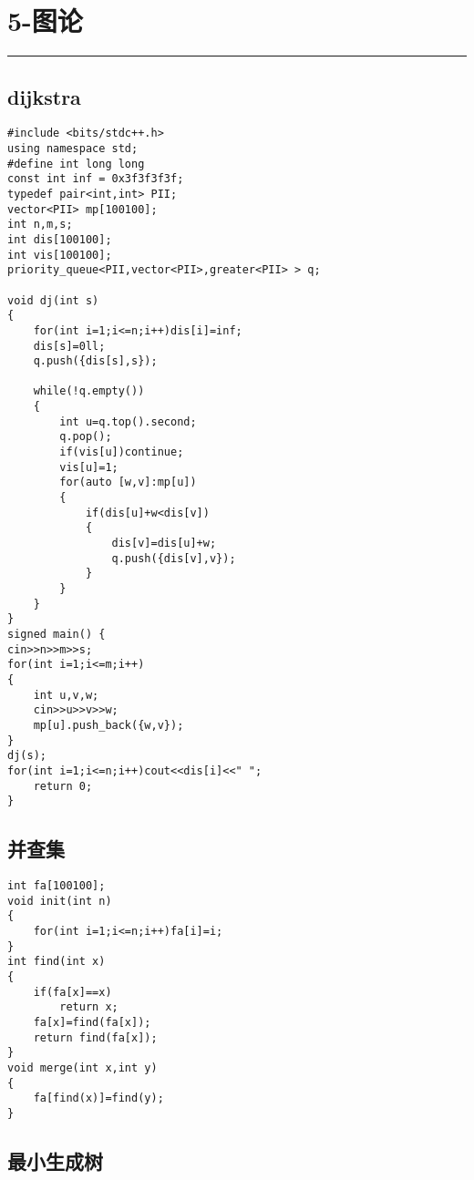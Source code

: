 \documentclass[]{article}
\begin{document}
\hypertarget{ux56feux8bba}{%
\section{5-图论}\label{ux56feux8bba}}

\begin{center}\rule{0.5\linewidth}{0.5pt}\end{center}

\hypertarget{dijkstra}{%
\subsection{dijkstra}\label{dijkstra}}

\begin{verbatim}
#include <bits/stdc++.h>
using namespace std;
#define int long long
const int inf = 0x3f3f3f3f;
typedef pair<int,int> PII;
vector<PII> mp[100100];
int n,m,s;
int dis[100100];
int vis[100100];
priority_queue<PII,vector<PII>,greater<PII> > q;

void dj(int s)
{
    for(int i=1;i<=n;i++)dis[i]=inf;
    dis[s]=0ll;
    q.push({dis[s],s});
    
    while(!q.empty())
    {
        int u=q.top().second;
        q.pop();
        if(vis[u])continue;
        vis[u]=1;
        for(auto [w,v]:mp[u])
        {
            if(dis[u]+w<dis[v])
            {
                dis[v]=dis[u]+w;
                q.push({dis[v],v});
            }
        }
    }
}
signed main() {
cin>>n>>m>>s;
for(int i=1;i<=m;i++)
{
    int u,v,w;
    cin>>u>>v>>w;
    mp[u].push_back({w,v});
}
dj(s);
for(int i=1;i<=n;i++)cout<<dis[i]<<" ";
    return 0;
}
\end{verbatim}

\hypertarget{ux5e76ux67e5ux96c6-1}{%
\subsection{并查集}\label{ux5e76ux67e5ux96c6-1}}

\begin{verbatim}
int fa[100100];
void init(int n)
{
    for(int i=1;i<=n;i++)fa[i]=i;
}
int find(int x)
{
    if(fa[x]==x)
        return x;
    fa[x]=find(fa[x]);
    return find(fa[x]);
}
void merge(int x,int y)
{
    fa[find(x)]=find(y);
}
\end{verbatim}

\hypertarget{ux6700ux5c0fux751fux6210ux6811}{%
\subsection{最小生成树}\label{ux6700ux5c0fux751fux6210ux6811}}
\end{document}
